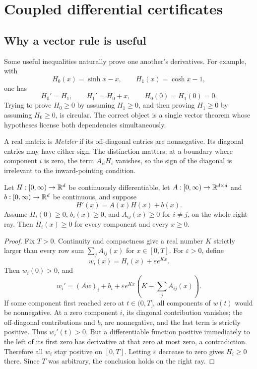 \section{Coupled differential certificates}
\label{sec:systems}


\subsection{Why a vector rule is useful}

Some useful inequalities naturally prove one another's derivatives. For example, with
\[
 H_0(x)=\sinh x-x,\qquad H_1(x)=\cosh x-1,
\]
one has
\[
 H_0'=H_1,\qquad H_1'=H_0+x,
 \qquad H_0(0)=H_1(0)=0.
\]
Trying to prove $H_0\ge0$ by assuming $H_1\ge0$, and then proving $H_1\ge0$ by assuming $H_0\ge0$, is circular. The correct object is a single vector theorem whose hypotheses license both dependencies simultaneously.

A real matrix is \emph{Metzler} if its off-diagonal entries are nonnegative. Its diagonal entries may have either sign. The distinction matters: at a boundary where component $i$ is zero, the term $A_{ii}H_i$ vanishes, so the sign of the diagonal is irrelevant to the inward-pointing condition.

\begin{theorem}
\label{thm:system}
Let $H:[0,\infty)\to\mathbb R^d$ be continuously differentiable, let $A:[0,\infty)\to\mathbb R^{d\times d}$ and $b:[0,\infty)\to\mathbb R^d$ be continuous, and suppose
\begin{equation}
 H'(x)=A(x)H(x)+b(x).
 \label{eq:system}
\end{equation}
Assume $H_i(0)\ge0$, $b_i(x)\ge0$, and $A_{ij}(x)\ge0$ for $i\ne j$, on the whole right ray. Then $H_i(x)\ge0$ for every component and every $x\ge0$.
\end{theorem}
\begin{proof}
Fix $T>0$. Continuity and compactness give a real number $K$ strictly larger than every row sum $\sum_jA_{ij}(x)$ for $x\in[0,T]$. For $\varepsilon>0$, define
\[
 w_i(x)=H_i(x)+\varepsilon e^{Kx}.
\]
Then $w_i(0)>0$, and
\[
 w_i'=(Aw)_i+b_i+
 \varepsilon e^{Kx}\left(K-\sum_jA_{ij}(x)\right).
\]
If some component first reached zero at $t\in(0,T]$, all components of $w(t)$ would be nonnegative. At a zero component $i$, its diagonal contribution vanishes; the off-diagonal contributions and $b_i$ are nonnegative, and the last term is strictly positive. Thus $w_i'(t)>0$. But a differentiable function positive immediately to the left of its first zero has derivative at that zero at most zero, a contradiction. Therefore all $w_i$ stay positive on $[0,T]$. Letting $\varepsilon$ decrease to zero gives $H_i\ge0$ there. Since $T$ was arbitrary, the conclusion holds on the right ray.
\end{proof}

